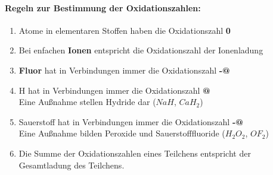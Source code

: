 \documentclass[a4paper]{article}
\makeatletter
\newcommand*{\rom}[1]{\expandafter\@slowromancap\romannumeral #1@}
\makeatother
\begin{document}
\paragraph{Regeln zur Bestimmung der Oxidationszahlen:}
\begin{enumerate}
    \item Atome in elementaren Stoffen haben die Oxidationszahl \textbf{0}
    \item Bei enfachen \textbf{Ionen} entspricht die Oxidationszahl der Ionenladung
    \item \textbf{Fluor} hat in Verbindungen immer die Oxidationszahl \textbf{-\rom{1}}
    \item H hat in Verbindungen immer die Oxidationszahl \textbf{\rom{1}}\\
            Eine Außnahme stellen Hydride dar ($NaH$, $CaH_2$)
    \item Sauerstoff hat in Verbindungen immer die Oxidationszahl \textbf{-\rom{2}}\\
            Eine Außnahme bilden Peroxide und Sauerstofffluoride ($H_2O_2$, $OF_2$)
    \item Die Summe der Oxidationszahlen eines Teilchens entspricht der Gesamtladung des Teilchens.
\end{enumerate}
\end{document}
